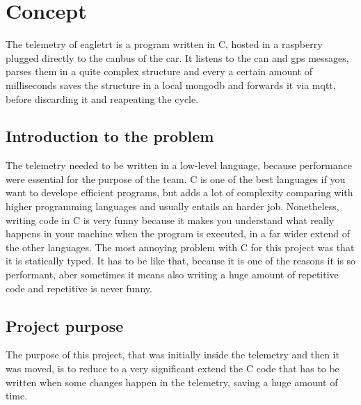 \section{\huge{Concept}}
The telemetry of eagletrt is a program written in C, hosted in a raspberry plugged directly to the canbus of the car. It listens to the can and gps messages, parses
them in a quite complex structure and every a certain amount of milliseconds saves the structure in a local mongodb and forwards it via mqtt,
before discarding it and reapeating the cycle.

\subsection{Introduction to the problem}
The telemetry needed to be written in a low-level language, because performance were essential for the purpose of the team. C is one of the best
languages if you want to develope efficient programs, but adds a lot of complexity comparing with higher programming languages and usually entails an
harder job. Nonetheless, writing code in C is very funny because it makes you understand what really happens in your machine when the program 
is executed, in a far wider extend of the other languages. The most annoying problem with C for this project was that it is statically typed.
It has to be like that, because it is one of the reasons it is so performant, aber sometimes it means also writing a huge amount of repetitive
code and repetitive is never funny.

\subsection{Project purpose}
The purpose of this project, that was initially inside the telemetry and then it was moved, is to reduce to a very significant extend the C code
that has to be written when some changes happen in the telemetry, saving a huge amount of time.